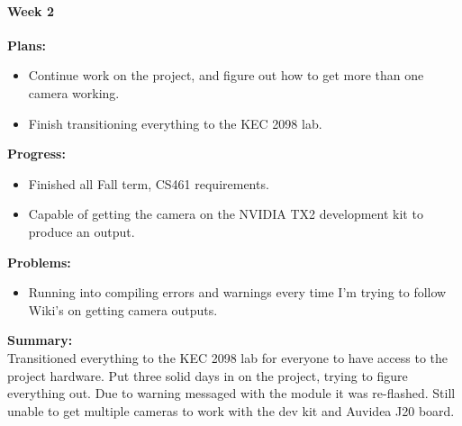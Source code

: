 \paragraph{Week 2}
\begin{adjustwidth}{2.5em}{0pt}
    \vspace{-0.5cm}\textbf{Plans:}
    \vspace{-0.5cm}
    \begin{itemize}
        \item Continue work on the project, and figure out how to get more than one camera working. 
		\item Finish transitioning everything to the KEC 2098 lab. 
    \end{itemize} 
    \vspace{-0.3cm}\textbf{Progress:}
    \vspace{-0.5cm}
    \begin{itemize}
        \item Finished all Fall term, CS461 requirements.
		\item Capable of getting the camera on the NVIDIA TX2 development kit to produce an output. 
    \end{itemize} 
    \vspace{-0.3cm}\textbf{Problems:}
    \vspace{-0.5cm}
    \begin{itemize}
        \item Running into compiling errors and warnings every time I'm trying to follow Wiki's on getting camera outputs. 
    \end{itemize}  
    \vspace{-0.3cm}\noindent\textbf{Summary:}\\
    \noindent Transitioned everything to the KEC 2098 lab for everyone to have access to the project hardware. Put three solid days in on the project, trying to figure everything out. Due to warning messaged with the module it was re-flashed. Still unable to get multiple cameras to work with the dev kit and Auvidea J20 board. 
\end{adjustwidth} 


